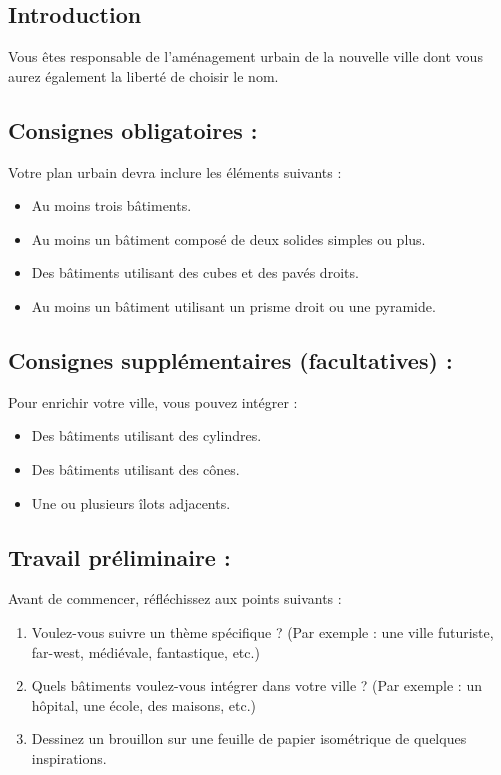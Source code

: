 

\subsection*{Introduction}
Vous êtes responsable de l'aménagement urbain de la nouvelle ville dont vous aurez également la liberté de choisir le nom.  

\subsection*{Consignes obligatoires :}
Votre plan urbain devra inclure les éléments suivants :
\begin{itemize}
    \item Au moins trois bâtiments.
    \item Au moins un bâtiment composé de deux solides simples ou plus.
    \item Des bâtiments utilisant des cubes et des pavés droits.
    \item Au moins un bâtiment utilisant un prisme droit ou une pyramide.
\end{itemize}

\subsection*{Consignes supplémentaires (facultatives) :}
Pour enrichir votre ville, vous pouvez intégrer :
\begin{itemize}
    \item Des bâtiments utilisant des cylindres.
    \item Des bâtiments utilisant des cônes.
    \item Une ou plusieurs îlots adjacents.
\end{itemize}

\subsection*{Travail préliminaire :}
Avant de commencer, réfléchissez aux points suivants :
\begin{enumerate}
    \item Voulez-vous suivre un thème spécifique ? 
    (Par exemple : une ville futuriste, far-west, médiévale, fantastique, etc.)
    \item Quels bâtiments voulez-vous intégrer dans votre ville ? 
    (Par exemple : un hôpital, une école, des maisons, etc.)
    \item Dessinez un brouillon sur une feuille de papier isométrique de quelques inspirations.
\end{enumerate}

